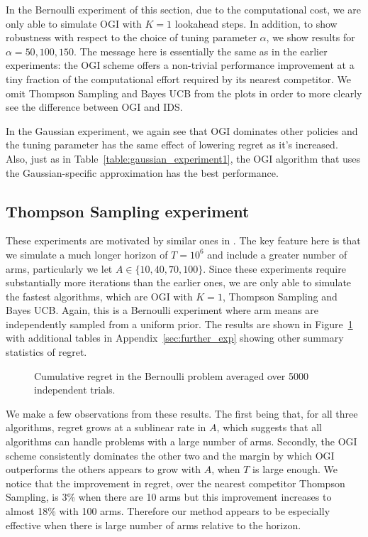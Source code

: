 In the Bernoulli experiment of this section, due to the computational cost, we are only able to simulate OGI with $K = 1$ lookahead steps. In addition, to show robustness with respect to the choice of tuning parameter $\alpha$, we show results for $\alpha = 50,100,150$. The message here is essentially the same as in the earlier experiments: the OGI scheme offers a non-trivial performance improvement at a tiny fraction of the computational effort required by its nearest competitor. We omit Thompson Sampling and Bayes UCB from the plots in order to more clearly see the difference between OGI and IDS.

In the Gaussian experiment, we again see that OGI dominates other policies and the tuning parameter has the same effect of lowering regret as it's increased. Also, just as in Table~\ref{table:gaussian_experiment1}, the OGI algorithm that uses the Gaussian-specific approximation has the best performance. 

\subsection{Thompson Sampling experiment} \label{exp:ts_sampling_experiment}
These experiments are motivated by similar ones in \cite{chapelle2011empirical}. The key feature here is that we simulate a much longer horizon of $T = 10^6$ and include a greater number of arms, particularly we let $A \in \{10,40,70,100\}$. Since these experiments require substantially more iterations than the earlier ones, we are only able to simulate the fastest algorithms, which are OGI with $K=1$, Thompson Sampling and Bayes UCB. Again, this is a Bernoulli experiment where arm means are independently sampled from a uniform prior. The results are shown in Figure~\ref{fig:chapelle_and_li} with additional tables in Appendix~\ref{sec:further_exp} showing other summary statistics of regret.
\begin{figure}
	\centering
	
	\caption{Cumulative regret in the Bernoulli problem averaged over 5000 independent trials.}
	\label{fig:chapelle_and_li}
\end{figure}

We make a few observations from these results. The first being that, for all three algorithms, regret grows at a sublinear rate in $A$, which suggests that all algorithms can handle problems with a large number of arms. Secondly, the OGI scheme consistently dominates the other two and the margin by which OGI outperforms the others appears to grow with $A$, when $T$ is large enough. We notice that the improvement in regret, over the nearest competitor Thompson Sampling, is 3\% when there are 10 arms but this improvement increases to almost 18\% with 100 arms. Therefore our method appears to be especially effective when there is large number of arms relative to the horizon.
